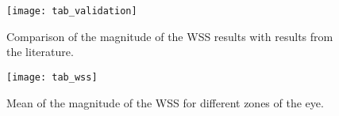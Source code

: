 \documentclass[a4paper]{article}
\begin{document}
\begin{figure}
    \centering

    \def\subfigwidth{\textwidth}

    \begin{subtable}{0.5\textwidth}
        \texttt{[image: tab\_validation]}
        \caption{Comparison of the magnitude of the WSS results with results from the literature.}
        \label{tab:validation}
    \end{subtable}
    \begin{subtable}{0.45\textwidth}
        \centering
        \texttt{[image: tab\_wss]}
        \caption{Mean of the magnitude of the WSS for different zones of the eye.}
        \label{tab:wss}
    \end{subtable}


\end{figure}
\end{document}
